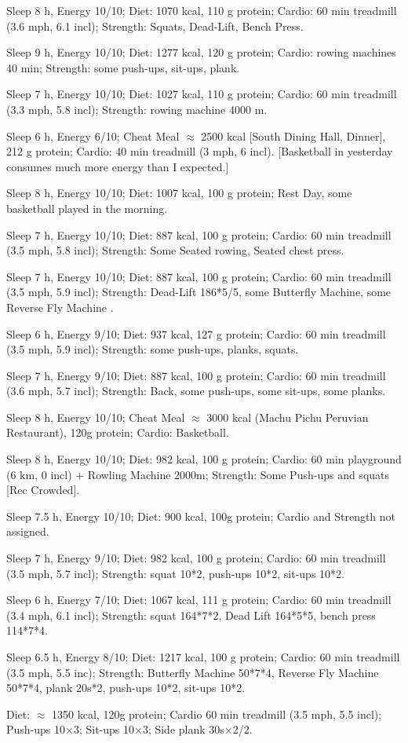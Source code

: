 \item [Sep 16] Sleep 8 h, Energy 10/10; Diet:  1070 kcal, 110 g protein; Cardio: 60 min treadmill (3.6 mph, 6.1 incl); Strength: Squats, Dead-Lift, Bench Press.
\item [Sep 15] Sleep 9 h, Energy 10/10; Diet:  1277 kcal, 120 g protein; Cardio: rowing machines 40 min; Strength: some push-ups, sit-ups, plank.
\item [Sep 14] Sleep 7 h, Energy 10/10; Diet: 1027 kcal, 110 g protein; Cardio: 60 min treadmill (3.3 mph, 5.8 incl); Strength: rowing machine 4000 m.
\item [Sep 13] Sleep 6 h, Energy 6/10; Cheat Meal $\approx$ 2500 kcal [South Dining Hall, Dinner], 212 g protein; Cardio: 40 min treadmill (3 mph, 6 incl). [Basketball in yesterday consumes much more energy than I expected.]
\item [Sep 12] Sleep 8 h, Energy 10/10; Diet: 1007 kcal, 100 g protein; Rest Day, some basketball played in the morning.
\item [Sep 11] Sleep 7 h, Energy 10/10; Diet:  887 kcal, 100 g protein; Cardio: 60 min treadmill (3.5 mph, 5.8  incl); Strength: Some Seated rowing, Seated chest press.
\item [Sep 10] Sleep 7 h, Energy 10/10; Diet: 887 kcal, 100 g protein; Cardio: 60 min treadmill (3.5 mph, 5.9 incl); Strength: Dead-Lift 186*5/5, some Butterfly Machine, some Reverse Fly Machine  .
\item [Sep 9] Sleep 6 h, Energy 9/10; Diet: 937 kcal, 127 g protein; Cardio: 60 min treadmill (3.5 mph, 5.9 incl); Strength: some push-ups, planks, squats.
\item [Sep 8] Sleep 7 h, Energy 9/10; Diet: 887 kcal, 100 g protein; Cardio: 60 min treadmill (3.6 mph, 5.7 incl); Strength: Back, some push-ups, some sit-ups, some planks.
\item [Sep 7] Sleep 8 h, Energy 10/10; Cheat Meal $\approx$ 3000 kcal (Machu Pichu Peruvian Restaurant), 120g protein; Cardio: Basketball.
\item [Sep 6] Sleep 8 h, Energy 10/10; Diet:  982 kcal, 100 g protein; Cardio: 60 min playground (6 km, 0 incl) + Rowling Machine 2000m; Strength: Some Push-ups and squats [Rec Crowded].
\item [Sep 5] Sleep 7.5 h, Energy 10/10; Diet:  900 kcal, 100g protein; Cardio and Strength not assigned.
\item [Sep 4] Sleep 7 h, Energy 9/10; Diet: 982 kcal, 100 g protein; Cardio: 60 min treadmill (3.5 mph, 5.7 incl); Strength: squat 10*2, push-ups 10*2, sit-ups 10*2.
\item [Sep 3] Sleep 6 h, Energy 7/10; Diet: 1067 kcal, 111 g protein; Cardio: 60 min treadmill (3.4 mph, 6.1 incl); Strength: squat 164*7*2, Dead Lift 164*5*5, bench press 114*7*4.
\item [Sep 2] Sleep 6.5 h, Energy 8/10; Diet: 1217 kcal, 100 g protein; Cardio: 60 min treadmill (3.5 mph, 5.5 inc); Strength: Butterfly Machine 50*7*4, Reverse Fly Machine 50*7*4, plank 20s*2, push-ups 10*2, sit-ups 10*2.
\item [Sep 1] Diet: $\approx$ 1350 kcal, 120g protein; Cardio 60 min treadmill (3.5 mph, 5.5 incl); Push-ups 10×3; Sit-ups 10×3; Side plank 30s×2/2.